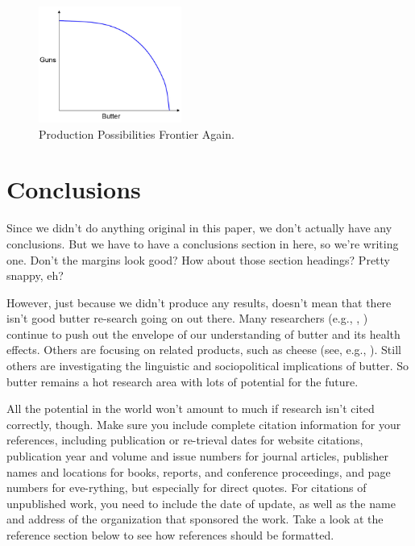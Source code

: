 \documentclass[mnsc,blindrev]{informs3}
\begin{document}
\begin{figure}[t]
\begin{center}
\includegraphics[height=1.5in]{Sample-Figure.pdf}
\caption{Production Possibilities Frontier Again.} \label{ECfrontier}
\end{center}
\end{figure}



\section{Conclusions}

Since we didn't do anything original in this paper, we don't
actually have any conclusions.  But we have to have a conclusions
section in here, so we're writing one.  Don't the margins look good?
How about those section headings?  Pretty snappy, eh?

However, just because we didn't produce any results, doesn't mean
that there isn't good butter re-search going on out there.  Many
researchers 
(e.g., \citealt{trbn}, \citealt{h})
continue to push out the envelope of our understanding of butter and
its health effects.  Others are focusing on related products, such as cheese 
(see, e.g., \citealt{fo}).  
Still others are
investigating the linguistic 
\citep{fs}
and sociopolitical 
\citep{g}
implications of butter.  So butter
remains a hot research area with lots of potential for the future.

All the potential in the world won't amount to much if research
isn't cited correctly, though. Make sure you include complete
citation information for your references, including publication or
re-trieval dates for website citations, publication year and volume
and issue numbers for journal articles, publisher names and
locations for books, reports, and conference proceedings, and page
numbers for eve-rything, but especially for direct quotes. For
citations of unpublished work, you need to include the date of
update, as well as the name and address of the organization that
sponsored the work. Take a look at the reference section below to
see how references should be formatted.
\end{document}
